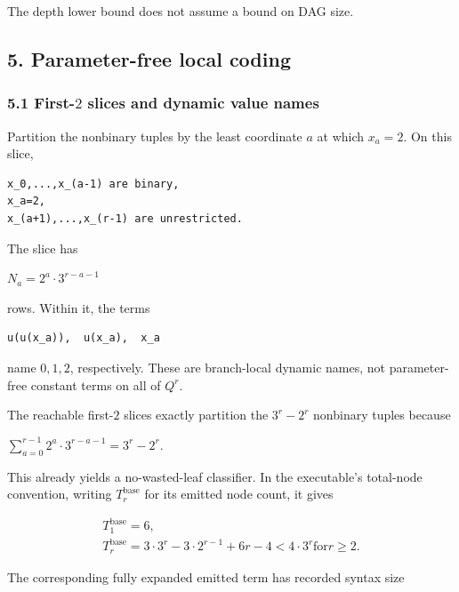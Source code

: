\documentclass[
  11pt,
]{article}
\theoremstyle{definition}
\theoremstyle{remark}
\begin{document}
The depth lower bound does not assume a bound on DAG size.

\hypertarget{parameter-free-local-coding}{%
\subsection{5. Parameter-free local
coding}\label{parameter-free-local-coding}}

\hypertarget{first-2-slices-and-dynamic-value-names}{%
\subsubsection{\texorpdfstring{5.1 First-\(2\) slices and dynamic value
names}{5.1 First-2 slices and dynamic value names}}\label{first-2-slices-and-dynamic-value-names}}

Partition the nonbinary tuples by the least coordinate \(a\) at which
\(x_a=2\). On this slice,

\begin{lstlisting}
x_0,...,x_(a-1) are binary,
x_a=2,
x_(a+1),...,x_(r-1) are unrestricted.
\end{lstlisting}

The slice has

\(N_a=2^a\mathbin{\cdot}3^{r-a-1}\)

rows. Within it, the terms

\begin{lstlisting}
u(u(x_a)),  u(x_a),  x_a
\end{lstlisting}

name \(0,1,2\), respectively. These are branch-local dynamic names, not
parameter-free constant terms on all of \(Q^r\).

The reachable first-\(2\) slices exactly partition the \(3^r-2^r\)
nonbinary tuples because

\(\sum_{a=0}^{r-1} 2^a\mathbin{\cdot}3^{r-a-1} = 3^r-2^r\).

This already yields a no-wasted-leaf classifier. In the executable's
total-node convention, writing \(T_r^{\mathrm{base}}\) for its emitted
node count, it gives

\[
\begin{aligned}
T_1^{\mathrm{base}}=6, \\
T_r^{\mathrm{base}}=3\mathbin{\cdot}3^r-3\mathbin{\cdot}2^{r-1}+6r-4 < 4\mathbin{\cdot}3^r  \text{for} r\ge 2.
\end{aligned}
\]

The corresponding fully expanded emitted term has recorded syntax size
\end{document}
